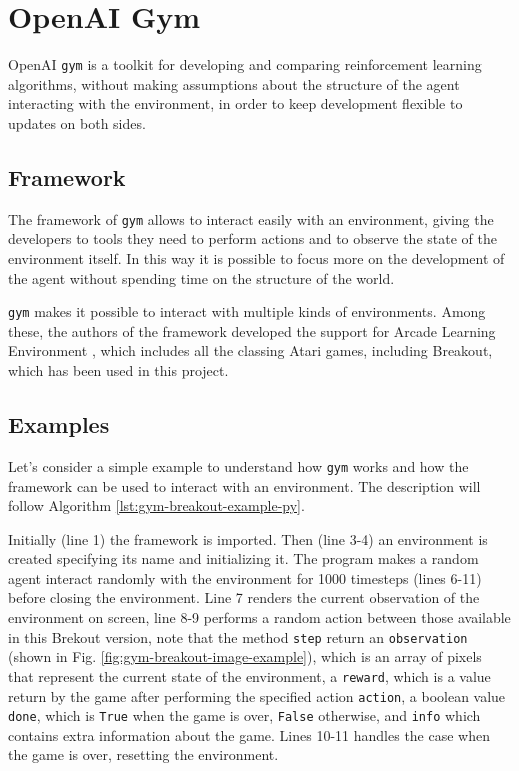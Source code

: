 \section{OpenAI Gym}
\label{sec:openaigym}
OpenAI \texttt{gym} \cite{1606.01540} is a toolkit for developing and comparing
reinforcement learning algorithms, without making assumptions about the
structure of the agent interacting with the environment, in order to
keep development flexible to updates on both sides.

\subsection{Framework}
The framework of \texttt{gym} allows to interact easily
with an environment, giving the developers to tools they need to perform
actions and to observe the state of the environment itself. In this way it is
possible to focus more on the development of the agent without spending
time on the structure of the world.

\texttt{gym} makes it possible to interact with multiple kinds of environments.
Among these, the authors of the framework developed the support for
Arcade Learning Environment \cite{bellemare13arcade}, which includes all the
classing Atari games, including Breakout, which has been used in this project.

\subsection{Examples}
Let's consider a simple example to understand how \texttt{gym} works and
how the framework can be used to interact with an environment.
The description will follow Algorithm \ref{lst:gym-breakout-example-py}.



Initially (line 1) the framework is imported. Then (line 3-4) an environment
is created specifying its name and initializing it. The program makes a
random agent interact randomly with the environment for 1000 timesteps (lines
6-11) before closing the environment. Line 7 renders the current
observation of the environment on screen, line 8-9 performs a random action
between those available in this Brekout version, note that the method
\texttt{step} return an \texttt{observation} (shown in Fig.
\ref{fig:gym-breakout-image-example}), which is an array of pixels
that represent the current state of the environment, a \texttt{reward},
which is a value return by the game after performing the specified action
\texttt{action}, a boolean value \texttt{done}, which is \texttt{True} when
the game is over, \texttt{False} otherwise, and \texttt{info} which contains
extra information about the game. Lines 10-11 handles the case when the game
is over, resetting the environment.

